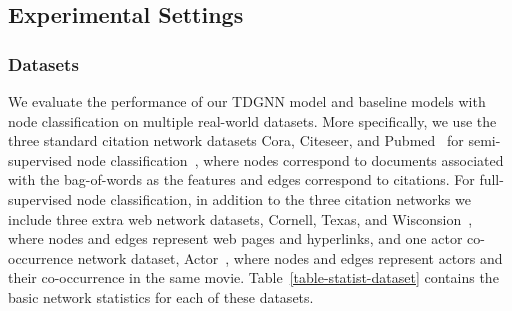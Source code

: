 \subsection{Experimental Settings}

\subsubsection{Datasets}
We evaluate the performance of our TDGNN model and baseline models with node classification on multiple real-world datasets. More specifically, we use the three standard citation network datasets Cora, Citeseer, and Pubmed~\cite{sen2008collective} for semi-supervised node classification~\cite{yang2016revisiting}, where nodes correspond to documents associated with the bag-of-words as the features and edges correspond to citations. For full-supervised node classification, in addition to the three citation networks we include three extra web network datasets, Cornell, Texas, and Wisconsion~\cite{geomgcn}, where nodes and edges represent web pages and hyperlinks, and one actor co-occurrence network dataset, Actor~\cite{geomgcn}, where nodes and edges represent actors and their co-occurrence in the same movie.
Table~\ref{table-statist-dataset} contains the basic network statistics for each of these datasets.



